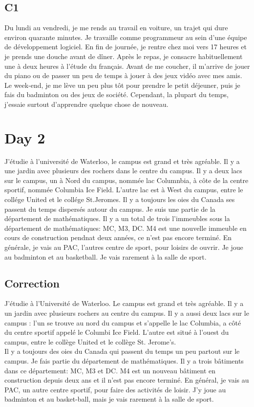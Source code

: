 \documentclass{book}
\begin{document}
    \subsection{C1}
        Du lundi au vendredi, je me rends au travail en voiture, un trajet qui dure environ quarante minutes.
        Je travaille comme programmeur au sein d'une équipe de développement logiciel. 
        En fin de journée, je rentre chez moi vers 17 heures et je prends une douche avant de dîner. 
        Après le repas, je consacre habituellement une à deux heures à l'étude du français.
        Avant de me coucher, il m'arrive de jouer du piano ou de passer un peu de temps à jouer à des jeux vidéo avec mes amis.
        Le week-end, je me lève un peu plus tôt pour prendre le petit déjeuner, puis je fais du badminton ou des jeux de société.
        Cependant, la plupart du temps, j'essaie surtout d'apprendre quelque chose de nouveau.

\section{Day 2}
        J'étudie à l'université de Waterloo, le campus est grand et très agréable. Il y a une jardin avec plusieurs des rochers dans le centre du campus.
        Il y a deux lacs sur le campus, un à Nord du campus, nommée lac Columnbia, à côte de la centre sportif, nommée Columbia Ice Field.
        L'autre lac est à West du campus, entre le collége United et le collége St.Jeromes. 
        Il y a toujours les oies du Canada ses passent du temps dispersés autour du campus.
        Je suis une partie de la département de mathématiques. 
        Il y a un total de trois l'immeubles sous la département de mathématiques: MC, M3, DC.
        M4 est une nouvelle immeuble en cours de construction pendnat deux années, ce n'est pas encore terminé.
        En générale, je vais au PAC, l'autres centre de sport, pour loisirs de ouvrir.
        Je joue au badminton et au basketball. Je vais rarement à la salle de sport.

    \subsection{Correction}
        J'étudie à l'Université de Waterloo. Le campus est grand et très agréable.
        Il y a un jardin avec plusieurs rochers au centre du campus.
        Il y a aussi deux lacs sur le campus : l'un se trouve au nord du campus et s'appelle le lac Columbia, a côté du centre sportif appelé le Columbi Ice Field.
        L'autre est situé à l'ouest du campus, entre le collège United et le collège St. Jerome's.
        \\
        Il y a toujours des oies du Canada qui passent du temps un peu partout sur le campus.
        Je fais partie du département de mathématiques. 
        Il y a trois bâtiments dans ce département: MC, M3 et DC. M4 est un nouveau bâtiment en construction depuis deux ans et il n'est pas encore terminé.
        En général, je vais au PAC, un autre centre sportif, pour faire des activités de loisir.
        J'y joue au badminton et au basket-ball, mais je vais rarement à la salle de sport.
\end{document}
